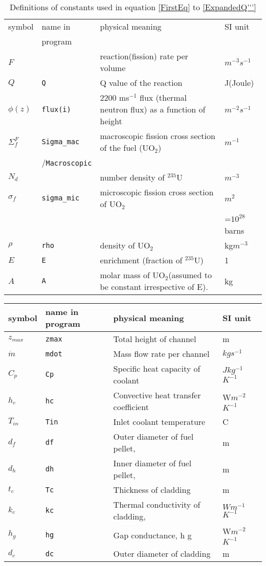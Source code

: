 \documentclass[a4paper, 12pt]{article}
\begin{document}
\begin{appendices} 
	
\begin{table}[!ht]
\begin{tabular}{llll}
\hline
symbol&name in&physical meaning & SI unit\\
&program&&\\
\hline
\hline
$F$		&& reaction(fission) rate per volume							&$m^{-3}s^{-1}$\\
$Q$ 	&\texttt{Q}&Q value of the reaction 											&J(Joule)\\
$\phi(z)$&\texttt{flux(i)}& 2200 ms${}^{-1}$ flux (thermal neutron flux) as a function of height &$m^{-2}s^{-1}$\\
$\Sigma_f^F$&\texttt{Sigma\_mac}& macroscopic fission cross section of the fuel (UO${}_2$)		&$m^{-1}$\\
&/\texttt{Macroscopic}&&\\
$N_d$ 	&& number density of ${}^{235}$U 									&$m^{-3}$\\
$\sigma_f$&\texttt{sigma\_mic}& microscopic fission cross section of UO${}_2$	&$m^{2}$\\
&&&=$10^{28}$barns\\
$\rho $ &\texttt{rho}& density of UO${}_2$											&kg$m^{-3}$\\
$E$ 	&\texttt{E}& enrichment (fraction of ${}^{235}$U)								&1\\
$A$ 	&\texttt{A}& molar mass of UO${}_2$(assumed to be constant irrespective of E).	&kg\\
\hline
\end{tabular}
\caption{Definitions of constants used in equation \ref{FirstEq} to \ref{ExpandedQ'''} }\label{table1}
\end{table}

\begin{table}[!ht]
\begin{tabular}{llll}

\hline
symbol&name in program&physical meaning & SI unit\\
\hline
$z_{max}$&\texttt{zmax}&Total height of channel 				&m\\
$\dot{m}$&\texttt{mdot}&Mass flow rate per channel 		&$kgs^{-1}$ \\
$C_p$	&\texttt{Cp}&Specific heat capacity of coolant 		&$Jkg^{-1}$ $K^{-1}$ \\
$h_c$	&\texttt{hc}&Convective heat transfer coefficient&W$m^{-2}$ $K^{-1}$ \\
$T_{in}$&\texttt{Tin}&Inlet coolant temperature 			& \textdegree C\\
\hline
$d_f$	&\texttt{df}&Outer diameter of fuel pellet, &m\\
$d_h$	&\texttt{dh}&Inner diameter of fuel pellet, &m\\
\hline
$t_c$	&\texttt{Tc}&Thickness of cladding &m\\
$k_c$	&\texttt{kc}&Thermal conductivity of cladding,  &$Wm^{-1}$ $K^{-1}$ \\
$h_g$	&\texttt{hg}&Gap conductance, h g &W$m^{-2}$ $K^{-1}$ \\
\hline
$d_c$	&\texttt{dc}&Outer diameter of cladding&m\\
\hline


\end{tabular}
\end{table}
\end{appendices}
\end{document}
